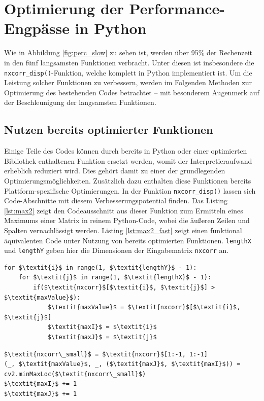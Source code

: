 \section{Optimierung der Performance-Engpässe in Python}

Wie in Abbildung \ref{fig:perc_slow} zu sehen ist, werden über 95\% der Rechenzeit in den fünf langsamsten Funktionen verbracht. Unter diesen ist insbesondere die \texttt{nxcorr\_disp()}-Funktion, welche komplett in Python implementiert ist. Um die Leistung solcher Funktionen zu verbessern, werden im Folgenden Methoden zur Optimierung des bestehenden Codes betrachtet -- mit besonderem Augenmerk auf der Beschleunigung der langsamsten Funktionen. 

\subsection{Nutzen bereits optimierter Funktionen}

Einige Teile des Codes können durch bereits in Python oder einer optimierten Bibliothek enthaltenen Funktion ersetzt werden, womit der Interpretieraufwand erheblich reduziert wird. Dies gehört damit zu einer der grundlegenden Optimierungsmöglichkeiten. Zusätzlich dazu enthalten diese Funktionen bereits Plattform-spezifische Optimierungen. In der Funktion \texttt{nxcorr\_disp()} lassen sich Code-Abschnitte mit diesem Verbesserungspotential finden. Das Listing \ref{lst:max2} zeigt den Codeausschnitt aus dieser Funktion zum Ermitteln eines Maximums einer Matrix in reinem Python-Code, wobei die äußeren Zeilen und Spalten vernachlässigt werden. Listing \ref{lst:max2_fast} zeigt einen funktional äquivalenten Code unter Nutzung von bereits optimierten Funktionen. \texttt{lengthX} und \texttt{lengthY} geben hier die Dimensionen der Eingabematrix \texttt{nxcorr} an. 

\begin{lstlisting}[caption={Finden des Maximums einer Matrix}, label={lst:max2}]
for $\textit{i}$ in range(1, $\textit{lengthY}$ - 1):
	for $\textit{j}$ in range(1, $\textit{lengthX}$ - 1):
		if($\textit{nxcorr}$[$\textit{i}$, $\textit{j}$] > $\textit{maxValue}$):
			$\textit{maxValue}$ = $\textit{nxcorr}$[$\textit{i}$, $\textit{j}$]
			$\textit{maxI}$ = $\textit{i}$
			$\textit{maxJ}$ = $\textit{j}$
\end{lstlisting}

\begin{lstlisting}[caption={Finden des Maximums einer Matrix mittels NumPy und OpenCV}, label={lst:max2_fast}]
$\textit{nxcorr\_small}$ = $\textit{nxcorr}$[1:-1, 1:-1]
(_, $\textit{maxValue}$, _, ($\textit{maxJ}$, $\textit{maxI}$)) = cv2.minMaxLoc($\textit{nxcorr\_small}$)
$\textit{maxI}$ += 1
$\textit{maxJ}$ += 1
\end{lstlisting}

